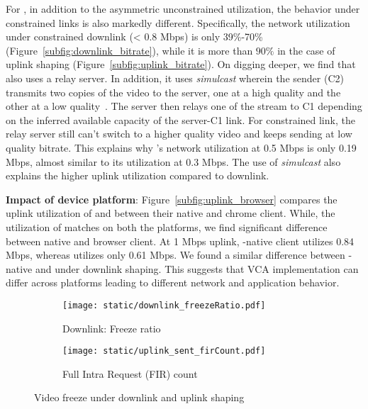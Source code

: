 For \meet, in addition to the asymmetric unconstrained utilization, the behavior under constrained links is also markedly different. Specifically, the network utilization under constrained downlink (< 0.8 Mbps) is only 39\%-70\% (Figure~\ref{subfig:downlink_bitrate}), while it is more than $90\%$ in the case of uplink shaping (Figure~\ref{subfig:uplink_bitrate}). On digging deeper, we find that \meet also uses a relay server. In addition, it uses \textit{simulcast} wherein the sender (C2) transmits two copies of the video to the server, one at a high quality and the other at a low quality~\cite{nistico2020comparative}. The server then relays one of the stream to C1 depending on the inferred available capacity of the server-C1 link. For constrained link, the relay server still can't switch to a higher quality video and keeps sending at low quality bitrate. This explains why \meet's network utilization at 0.5 Mbps is only 0.19 Mbps, almost similar to its utilization at 0.3 Mbps.  The use of \textit{simulcast} also explains the higher uplink utilization compared to downlink. %



\textbf{Impact of device platform}: Figure~\ref{subfig:uplink_browser} compares the uplink utilization of \zoom and \teams between their native and chrome client. While, the utilization of \zoom matches on both the platforms, we find significant difference between \teams native and browser client. At 1 Mbps uplink, \teams-native client utilizes 0.84 Mbps, whereas \teamsbrowser utilizes only 0.61 Mbps. We found a similar difference between \teams-native and \teamsbrowser under downlink shaping. This suggests that VCA implementation can differ across platforms leading to different network and application behavior. 


\begin{figure}[t]
    \centering
    \begin{subfigure}[t]{0.45\textwidth}      
        \texttt{[image: static/downlink\_freezeRatio.pdf]}
        \caption{Downlink: Freeze ratio}
 		\label{subfig:downlink_freeze_ratio}
    \end{subfigure}
	\begin{subfigure}[t]{0.45\textwidth}   
        \centering
        \texttt{[image: static/uplink\_sent\_firCount.pdf]}
    \caption{Full Intra Request (FIR) count}
    \label{subfig:uplink_fir}
    \end{subfigure}%
	\caption{Video freeze under downlink and uplink shaping}
	\label{fig:video_freeze}
\end{figure}







